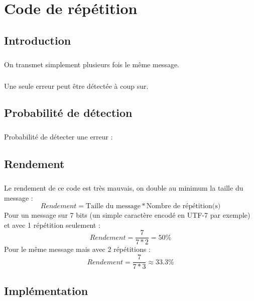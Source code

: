 
\chapter{Code de répétition}

    \section{Introduction}

        \paragraph{}
On transmet simplement plusieurs fois le même message.
        \paragraph{}
Une seule erreur peut être détectée à coup sur.


    \section{Probabilité de détection}

        \paragraph{}
Probabilité de détecter une erreur :


    \section{Rendement}

        \paragraph{}
Le rendement de ce code est très mauvais, on double au minimum la taille du message :
\[  Rendement = \text{Taille du message}*\text{Nombre de répétition(s)} \]
Pour un message sur 7 bits (un simple caractère encodé en UTF-7 par exemple) et avec 1 répétition seulement :
\[  Rendement = \frac{7}{7*2} = 50\% \]
Pour le même message mais avec 2 répétitions :
\[  Rendement = \frac{7}{7*3} \approx 33.3\% \]


    \section{Implémentation}

        \paragraph{}
